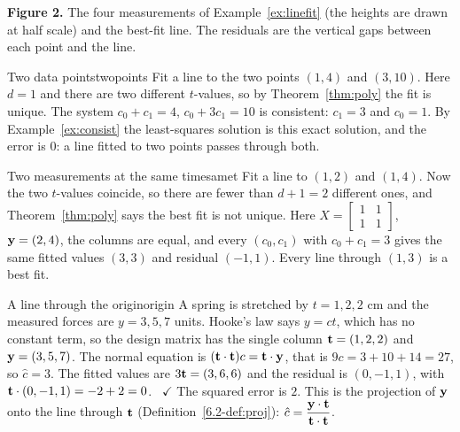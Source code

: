 \documentclass[11pt]{article}
\begin{document}
\begin{center}
\end{center}

\noindent\textbf{Figure 2.} The four measurements of Example~\ref{ex:linefit} (the heights are drawn at half scale) and the best-fit line. The residuals are the vertical gaps between each point and the line.

\begin{exmp}{Two data points}{twopoints}
Fit a line to the two points $(1,4)$ and $(3,10)$. Here $d=1$ and there are two different $t$-values, so by Theorem~\ref{thm:poly} the fit is unique. The system $c_0+c_1=4$, $c_0+3c_1=10$ is consistent: $c_1=3$ and $c_0=1$. By Example~\ref{ex:consist} the least-squares solution is this exact solution, and the error is $0$: a line fitted to two points passes through both.
\end{exmp}

\begin{exmp}{Two measurements at the same time}{samet}
Fit a line to $(1,2)$ and $(1,4)$. Now the two $t$-values coincide, so there are fewer than $d+1=2$ different ones, and Theorem~\ref{thm:poly} says the best fit is not unique. Here $X=\begin{bmatrix}1&1\\1&1\end{bmatrix}$, $\mathbf{y}=(2,4)$, the columns are equal, and every $(c_0,c_1)$ with $c_0+c_1=3$ gives the same fitted values $(3,3)$ and residual $(-1,1)$. Every line through $(1,3)$ is a best fit.
\end{exmp}

\begin{exmp}{A line through the origin}{origin}
A spring is stretched by $t=1,2,2$ cm and the measured forces are $y=3,5,7$ units. Hooke's law says $y=ct$, which has no constant term, so the design matrix has the single column $\mathbf{t}=(1,2,2)$ and $\mathbf{y}=(3,5,7)$. The normal equation is $(\mathbf{t}\cdot\mathbf{t})c=\mathbf{t}\cdot\mathbf{y}$, that is $9c=3+10+14=27$, so $\hat{c}=3$. The fitted values are $3\mathbf{t}=(3,6,6)$ and the residual is $(0,-1,1)$, with $\mathbf{t}\cdot(0,-1,1)=-2+2=0$. \ $\checkmark$ The squared error is $2$. This is the projection of $\mathbf{y}$ onto the line through $\mathbf{t}$ (Definition~\ref{6.2-def:proj}): $\hat{c}=\dfrac{\mathbf{y}\cdot\mathbf{t}}{\mathbf{t}\cdot\mathbf{t}}$.
\end{exmp}
\end{document}
